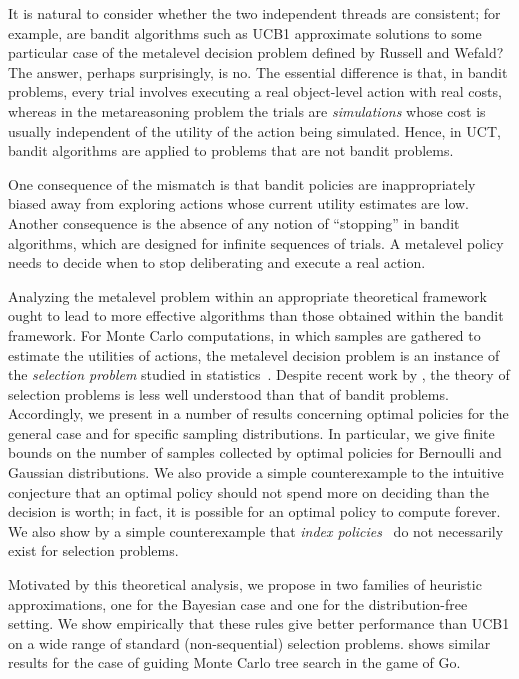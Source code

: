 It is natural to consider whether the two independent threads are
consistent; for example, are bandit algorithms such as UCB1 approximate
solutions to some particular case of the metalevel decision problem
defined by Russell and Wefald? The answer, perhaps surprisingly, is no.
The essential difference is that, in bandit problems, every trial involves
executing a real object-level action with real costs, whereas in the metareasoning
problem the trials are {\em simulations} whose cost is usually independent of the
utility of the action being simulated. 
Hence, in UCT, bandit algorithms are applied to problems that are not bandit problems.

One consequence of the mismatch is that bandit policies are
inappropriately biased away from exploring actions whose current
utility estimates are low.  Another consequence is the absence of any
notion of ``stopping'' in bandit algorithms, which are designed for
infinite sequences of trials.  A metalevel policy needs to decide
when to stop deliberating and execute a real action.

Analyzing the metalevel problem within an appropriate theoretical
framework ought to lead to more effective algorithms than those
obtained within the bandit framework.  For Monte Carlo computations,
in which samples are gathered to estimate the utilities of actions,
the metalevel decision problem is an instance of the {\em selection
problem} studied in statistics~\cite{early-selection-refs}.  Despite
recent work by \citet{Frazier+Powell:2010}, the theory of selection
problems is less well understood than that of bandit problems.
Accordingly, we present in 
a number of results concerning optimal policies for the general case
and for specific sampling distributions. In particular, we give finite
bounds on the number of samples collected by optimal policies for
Bernoulli and Gaussian distributions. We also provide a simple
counterexample to the intuitive conjecture that an optimal policy
should not spend more on deciding than the decision is worth; in fact,
it is possible for an optimal policy to compute forever. We also show
by a simple counterexample that {\em index
policies}~\cite{Gittins:1989} do not necessarily exist for selection
problems.

Motivated by this theoretical analysis, we propose in 
two families of heuristic approximations, one for the Bayesian case and one for the distribution-free setting.
We show empirically that these rules give better performance than UCB1 on a wide range of standard (non-sequential) selection problems.
 shows similar results for the case of guiding Monte Carlo tree search in the game of Go.


